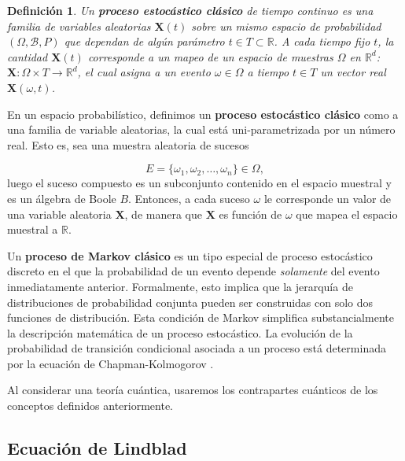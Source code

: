 \documentclass{report} %
\newtheorem{definition}{Definición}[section]
\numberwithin{equation}{section}
\begin{document}
\begin{Omitir}
 \begin{definition}
Un \textbf{proceso estocástico clásico} de tiempo continuo es una familia de variables aleatorias $\mathbf{X}(t)$ sobre un mismo espacio de probabilidad $(\Omega,\mathcal{B},P)$ que dependan de algún parámetro $t \in T \subset \mathbb{R}$. 
A cada tiempo fijo $t$, la cantidad $\mathbf{X}(t)$ corresponde a un mapeo de un espacio de muestras $\Omega$ en $\mathbb{R}^{d}$: $\mathbf{X} : \Omega \times T \rightarrow \mathbb{R}^{d}$, el cual asigna a un evento $\omega \in \Omega$ a tiempo $t \in T$ un vector real $\mathbf{X}(\omega,t)$.
 \end{definition}
\end{Omitir} 


En un espacio probabilístico, definimos un \textbf{proceso estocástico clásico} como a una familia de variable aleatorias, la cual está uni-parametrizada por un número real. Esto es, sea una muestra aleatoria de sucesos

\begin{equation*}
E = \{\omega_1,\omega_2,\ldots, \omega_n\} \in \Omega,
\end{equation*}
luego el suceso compuesto es un subconjunto contenido en el espacio muestral y es un álgebra de Boole $B$. Entonces, a cada suceso $\omega$ le corresponde un valor de una variable aleatoria $\mathbf{X}$, de manera que $\mathbf{X}$ es función de $\omega$ que mapea el espacio muestral a $\mathbb{R}$.

Un \textbf{proceso de Markov clásico} es un tipo especial de proceso estocástico discreto en el que la probabilidad de un evento depende \textit{solamente} del evento inmediatamente anterior. Formalmente, esto implica que la jerarquía de distribuciones de probabilidad conjunta pueden ser construidas con solo dos funciones de distribución. Esta condición de Markov simplifica substancialmente la descripción matemática de un proceso estocástico.  La evolución de la probabilidad de transición condicional asociada a un proceso está determinada por la ecuación de Chapman-Kolmogorov \cite{HeinzPetruccione, Dynkin89}.

Al considerar una teoría cuántica, usaremos los contrapartes cuánticos de los conceptos definidos anteriormente.

\subsection*{Ecuación de Lindblad} 
\end{document}
